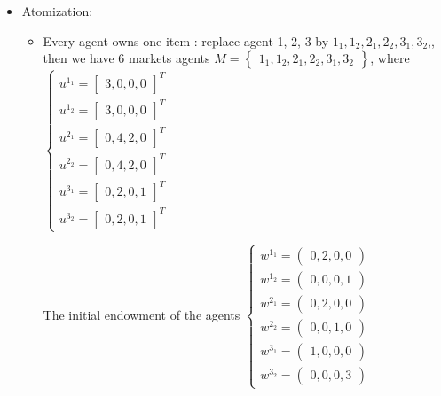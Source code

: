 \documentclass{article}
\newenvironment{answer}{\par\color{ForestGreen}}{\par}
\begin{document}
\begin{answer}
\begin{itemize}
    \item Atomization:
    \begin{itemize}
      \item Every agent owns one item : replace agent 1, 2, 3 by $ 1_1, 1_2, 2_1, 2_2, 3_1, 3_2$,, then we have
      $6$ markets agents $ M = \begin{Bmatrix} 1_1, 1_2, 2_1, 2_2, 3_1, 3_2 \end{Bmatrix}$,
      where
     $\begin{cases}
        u^{1_1} = \begin{bmatrix} 3, 0, 0, 0\end{bmatrix}^T \\
        u^{1_2} = \begin{bmatrix} 3, 0, 0, 0\end{bmatrix}^T \\
        u^{2_1} = \begin{bmatrix} 0, 4, 2, 0\end{bmatrix}^T \\
        u^{2_2} = \begin{bmatrix} 0, 4, 2, 0\end{bmatrix}^T \\
        u^{3_1} = \begin{bmatrix} 0, 2, 0, 1\end{bmatrix}^T \\
        u^{3_2} = \begin{bmatrix} 0, 2, 0, 1\end{bmatrix}^T
      \end{cases} $

      The initial endowment of the agents
      $\begin{cases}
         w^{1_1} = \begin{pmatrix} 0, 2, 0, 0 \end{pmatrix} \\
         w^{1_2} = \begin{pmatrix} 0, 0, 0, 1 \end{pmatrix} \\
         w^{2_1} = \begin{pmatrix} 0, 2, 0, 0 \end{pmatrix} \\
         w^{2_2} = \begin{pmatrix} 0, 0, 1, 0 \end{pmatrix} \\
         w^{3_1} = \begin{pmatrix} 1, 0, 0, 0 \end{pmatrix} \\
         w^{3_2} = \begin{pmatrix} 0, 0, 0, 3 \end{pmatrix}
       \end{cases} $


\end{itemize}
\end{itemize}
\end{answer}
\end{document}
